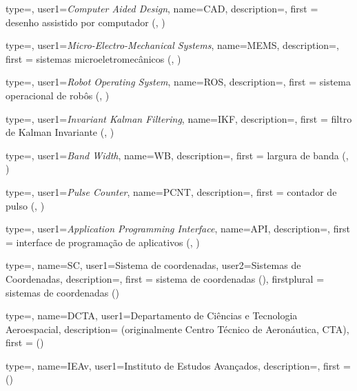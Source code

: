 {type=\acronymtype,
  user1={\emph{Computer Aided Design}},
  name={CAD},
  description={},
  first = {desenho assistido por computador (, )}
}

{type=\acronymtype,
  user1={\emph{Micro-Electro-Mechanical Systems}},
  name={MEMS},
  description={},
  first = {sistemas microeletromecânicos (, )}
}

{type=\acronymtype,
  user1={\emph{Robot Operating System}},
  name={ROS},
  description={},
  first = {sistema operacional de robôs (, )}
}

{type=\acronymtype,
  user1=\emph{Invariant Kalman Filtering},
  name={IKF},
  description={},
  first = {filtro de Kalman Invariante (, )}
}


{type=\acronymtype,
  user1=\emph{Band Width},
  name={WB},
  description={},
  first = {largura de banda (, )}
}

{type=\acronymtype,
  user1=\emph{Pulse Counter},
  name={PCNT},
  description={},
  first = {contador de pulso (, )}
}

{type=\acronymtype,
  user1=\emph{Application Programming Interface},
  name={API},
  description={},
  first = {interface de programação de aplicativos (, )}
}


{type=\acronymtype,
  name={SC},
  user1={Sistema de coordenadas},
  user2={Sistemas de Coordenadas},
  description={},
  first = {sistema de coordenadas ()},
  firstplural = {sistemas de coordenadas ()}
}


{type=\acronymtype,
  name={DCTA},
  user1={Departamento de Ciências e Tecnologia Aeroespacial},
  description={ (originalmente Centro Técnico de Aeronáutica, CTA)},
  first = { ()}
}

{type=\acronymtype,
  name={IEAv},
  user1={Instituto de Estudos Avançados},
  description={},
  first = { ()}
}

